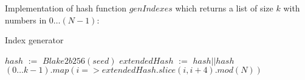 \documentclass[]{article}
\def\Let#1#2{\State #1 $:=$ #2}
\begin{document}
    Implementation of hash function $genIndexes$ which returns a list of size $k$ with numbers in $0\dots (N-1)$:

    \begin{algorithm}[H]
        \caption{Index generator}
        \label{alg:genIndexes}
        \begin{algorithmic}[1]
            \Let{$hash$}{$Blake2b256(seed)$}
            \Let{$extendedHash$}{$hash||hash$}
            \State \Return $(0\dots{k-1}).map(i => extendedHash.slice(i,i+4).mod(N))$
            \EndFunction
        \end{algorithmic}
    \end{algorithm}
\end{document}
